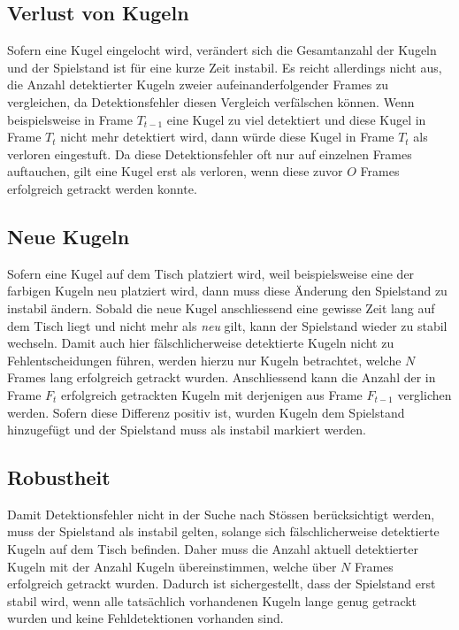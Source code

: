 \subsection{Verlust von Kugeln}
Sofern eine Kugel eingelocht wird, verändert sich die Gesamtanzahl der Kugeln und der Spielstand ist für eine kurze Zeit instabil.
Es reicht allerdings nicht aus, die Anzahl detektierter Kugeln zweier aufeinanderfolgender Frames zu vergleichen,
da Detektionsfehler diesen Vergleich verfälschen können.
Wenn beispielsweise in Frame $T_{t-1}$ eine Kugel zu viel detektiert und diese Kugel in Frame $T_{t}$ nicht mehr
detektiert wird, dann würde diese Kugel in Frame $T_{t}$ als verloren eingestuft.
Da diese Detektionsfehler oft nur auf einzelnen Frames auftauchen, gilt eine Kugel erst als verloren, wenn diese zuvor
$O$ Frames erfolgreich getrackt werden konnte.

\subsection{Neue Kugeln}
Sofern eine Kugel auf dem Tisch platziert wird, weil beispielsweise eine der farbigen Kugeln neu platziert wird,
dann muss diese Änderung den Spielstand zu instabil ändern.
Sobald die neue Kugel anschliessend eine gewisse Zeit lang auf dem Tisch liegt und nicht mehr als \emph{neu} gilt,
kann der Spielstand wieder zu stabil wechseln.
Damit auch hier fälschlicherweise detektierte Kugeln nicht zu Fehlentscheidungen führen, werden hierzu nur Kugeln
betrachtet, welche $N$ Frames lang erfolgreich getrackt wurden.
Anschliessend kann die Anzahl der in Frame $F_{t}$ erfolgreich getrackten Kugeln mit derjenigen aus Frame $F_{t-1}$
verglichen werden.
Sofern diese Differenz positiv ist, wurden Kugeln dem Spielstand hinzugefügt und der Spielstand muss als instabil markiert werden.

\subsection{Robustheit}
Damit Detektionsfehler nicht in der Suche nach Stössen berücksichtigt werden, muss der Spielstand als instabil gelten,
solange sich fälschlicherweise detektierte Kugeln auf dem Tisch befinden.
Daher muss die Anzahl aktuell detektierter Kugeln mit der Anzahl Kugeln übereinstimmen, welche über $N$ Frames erfolgreich
getrackt wurden.
Dadurch ist sichergestellt, dass der Spielstand erst stabil wird, wenn alle tatsächlich vorhandenen Kugeln lange genug
getrackt wurden und keine Fehldetektionen vorhanden sind.


